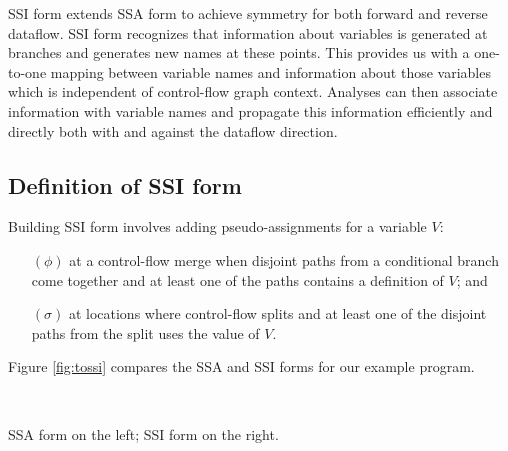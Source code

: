 \documentclass[12pt,notitlepage]{article}
\begin{document}
SSI form extends SSA form to achieve symmetry for both forward and
reverse dataflow.   SSI form recognizes that information about
variables is generated at branches and generates new names at these
points.  This provides us with a one-to-one mapping between variable
names and information about those variables which is independent of
control-flow graph context.  Analyses can then associate information
with variable names and propagate this information efficiently and
directly both with and against the dataflow direction.

\subsection{Definition of SSI form}
Building SSI form involves adding pseudo-assignments for a variable $V$:
\begin{enumerate}
\item[$(\phi)$] at a control-flow merge when disjoint paths from a
conditional branch come together and at least one of the paths
contains a definition of $V$; and
\item[$(\sigma)$] at locations where control-flow splits and at least
one of the disjoint paths from the split uses the value of $V$.
\end{enumerate}

Figure \ref{fig:tossi} compares the SSA and SSI forms for our example program.
\begin{myfigure}
\begin{center}
 \vline\ 
\end{center}
\caption{SSA form on the left; SSI form on the right.}
\label{fig:tossi}
\end{myfigure}
\end{document}
